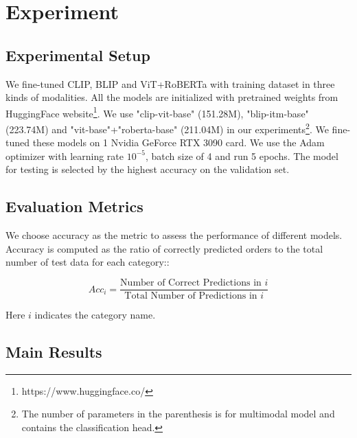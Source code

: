 \documentclass[11pt]{article}
\newcommand{\MY}[1]{\textcolor{orange}{(Mengyue: #1})}
\begin{document}
\section{Experiment}

\subsection{Experimental Setup}
We fine-tuned CLIP, BLIP and ViT+RoBERTa with training dataset in three kinds of modalities. All the models are initialized with pretrained weights from HuggingFace website\footnote{https://www.huggingface.co/}. We use "clip-vit-base" (151.28M), "blip-itm-base" (223.74M) and "vit-base"+"roberta-base" (211.04M) in our experiments\footnote{The number of parameters in the parenthesis is for multimodal model and contains the classification head.}. We fine-tuned these models on 1 Nvidia GeForce RTX 3090 card. We use the Adam\citep{kingma2014adam} optimizer with learning rate $10^{-5}$, batch size of 4 and run 5 epochs. The model for testing is selected by the highest accuracy on the validation set.

\subsection{Evaluation Metrics}
We choose accuracy as the metric to assess the performance of different models. Accuracy is computed as the ratio of correctly predicted orders to the total number of test data for each category::

\begin{equation}
    Acc_i = \frac{\text{Number of Correct Predictions in } i}{\text{Total Number of Predictions in }i}    
\end{equation}

Here $i$ indicates the category name.


\subsection{Main Results}
\end{document}

